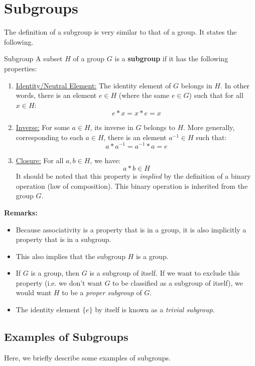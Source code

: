 \documentclass[letterpaper]{article}
\begin{document}
\newpage 
\section{Subgroups}
The definition of a subgroup is very similar to that of a group. It states the following. 
\begin{definition}{Subgroup}{}
    A subset $H$ of a group $G$ is a \textbf{subgroup} if it has the following properties: 
    \begin{enumerate}
        \item \underline{Identity/Neutral Element:} The identity element of $G$ belongs in $H$. In other words, there is an element $e \in H$ (where the same $e \in G$) such that for all $x \in H$:
        \[e * x = x * e = x\]

        \item \underline{Inverse:} For some $a \in H$, its inverse in $G$ belongs to $H$. More generally, corresponding to each $a \in H$, there is an element $a^{-1} \in H$ such that:
        \[a * a^{-1} = a^{-1} * a = e\]

        \item \underline{Closure:} For all $a, b \in H$, we have:
        \[a * b \in H\]
        It should be noted that this property is \emph{implied} by the definition of a binary operation (law of composition). This binary operation is inherited from the group $G$.  
    \end{enumerate}
\end{definition}
\textbf{Remarks:}
\begin{itemize}
    \item Because associativity is a property that is in a group, it is also implicitly a property that is in a subgroup. 
    \item This also implies that the subgroup $H$ is a group.
    \item If $G$ is a group, then $G$ is a subgroup of itself. If we want to exclude this property (i.e. we don't want $G$ to be classified as a subgroup of itself), we would want $H$ to be a \emph{proper subgroup} of $G$.
    \item The identity element $\{e\}$ by itself is known as a \emph{trivial subgroup}. 
\end{itemize}


\subsection{Examples of Subgroups}
Here, we briefly describe some examples of subgroups. 
\end{document}
